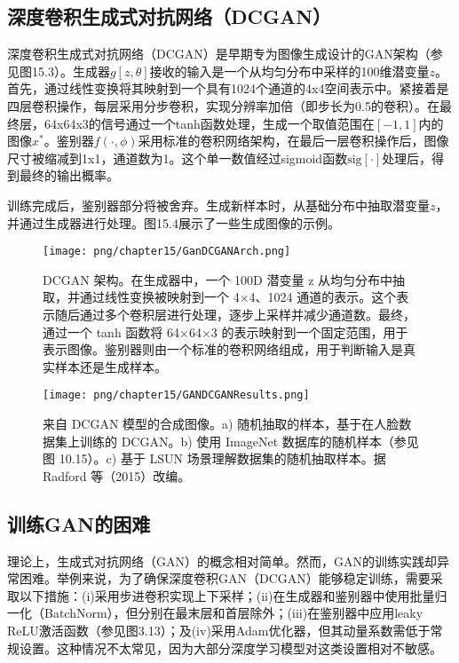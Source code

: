 \subsection{深度卷积生成式对抗网络（DCGAN）}
深度卷积生成式对抗网络（DCGAN）是早期专为图像生成设计的GAN架构（参见图15.3）。生成器\(g[z, \theta]\)接收的输入是一个从均匀分布中采样的100维潜变量\(z\)。首先，通过线性变换将其映射到一个具有1024个通道的4x4空间表示中。紧接着是四层卷积操作，每层采用分步卷积，实现分辨率加倍（即步长为0.5的卷积）。在最终层，64x64x3的信号通过一个tanh函数处理，生成一个取值范围在\([-1, 1]\)内的图像\(x^*\)。鉴别器\(f(\cdot, \phi)\)采用标准的卷积网络架构，在最后一层卷积操作后，图像尺寸被缩减到1x1，通道数为1。这个单一数值经过sigmoid函数\(\text{sig}[\cdot]\)处理后，得到最终的输出概率。

训练完成后，鉴别器部分将被舍弃。生成新样本时，从基础分布中抽取潜变量\(z\)，并通过生成器进行处理。图15.4展示了一些生成图像的示例。

\begin{figure}[ht!]
\centering
\texttt{[image: png/chapter15/GanDCGANArch.png]}
\caption{DCGAN 架构。在生成器中，一个 100D 潜变量 z 从均匀分布中抽取，并通过线性变换被映射到一个 4×4、1024 通道的表示。这个表示随后通过多个卷积层进行处理，逐步上采样并减少通道数。最终，通过一个 tanh 函数将 64×64×3 的表示映射到一个固定范围，用于表示图像。鉴别器则由一个标准的卷积网络组成，用于判断输入是真实样本还是生成样本。}
\end{figure}


\begin{figure}[ht!]
\centering
\texttt{[image: png/chapter15/GANDCGANResults.png]}
\caption{来自 DCGAN 模型的合成图像。a) 随机抽取的样本，基于在人脸数据集上训练的 DCGAN。b) 使用 ImageNet 数据库的随机样本（参见图 10.15）。c) 基于 LSUN 场景理解数据集的随机抽取样本。据 Radford 等（2015）改编。}
\end{figure}

\subsection{训练GAN的困难}
理论上，生成式对抗网络（GAN）的概念相对简单。然而，GAN的训练实践却异常困难。举例来说，为了确保深度卷积GAN（DCGAN）能够稳定训练，需要采取以下措施：(i)采用步进卷积实现上下采样；(ii)在生成器和鉴别器中使用批量归一化（BatchNorm），但分别在最末层和首层除外；(iii)在鉴别器中应用leaky ReLU激活函数（参见图3.13）；及(iv)采用Adam优化器，但其动量系数需低于常规设置。这种情况不太常见，因为大部分深度学习模型对这类设置相对不敏感。

